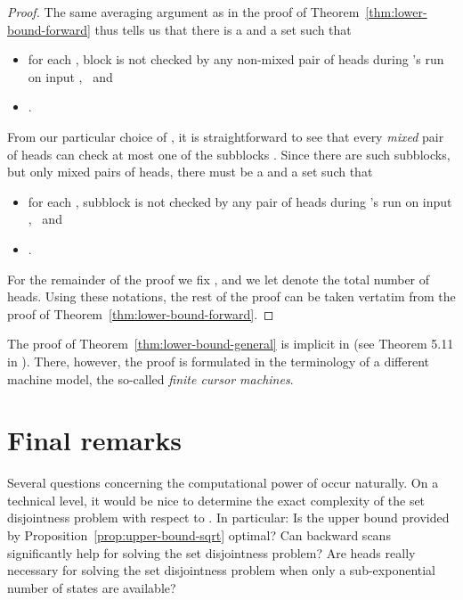 \documentclass[proceedings]{stacs}
\theoremstyle{plain}\newtheorem{satz}[thm]{Satz}
\theoremstyle{definition}\newtheorem{crucial}[thm]{Crucial Definition}
\newenvironment{mi}{\begin{itemize}}{\end{itemize}}
\newcommand{\auta}{\text{mp2s-automata}}
\begin{document}
\begin{proof}
The same averaging argument as in the proof of Theorem~\ref{thm:lower-bound-forward}
thus tells us that there is a
 and 
a set 
such that \vspace{1ex}
\begin{mi}
 \item 
   for each , block  is not checked by any non-mixed pair of
   heads during 's run on input
   , \ and  \vspace{1ex}
 \item 
   . \vspace{1ex}
\end{mi}
From our particular choice of , it is straightforward to see that every
\emph{mixed} pair of heads can check at most one of the subblocks
. Since there are  such subblocks, but
only  mixed pairs of heads, there must be a  
and a set  such that \vspace{1ex}
\begin{mi}
 \item 
   for each , subblock  is not checked by any pair of
   heads during 's run on input
   , \ and  \vspace{1ex}
 \item 
   . \vspace{1ex}
\end{mi}
For the remainder of the proof we fix , and we let
 denote the total number of heads. Using these notations, 
the rest of the proof can be taken vertatim from the proof of 
Theorem~\ref{thm:lower-bound-forward}.
\end{proof}


The proof of
Theorem~\ref{thm:lower-bound-general} is implicit in \cite{FCM-paper}
(see Theorem 5.11 in \cite{FCM-paper}). There, however, the proof is formulated
in the terminology of a different
machine model, the so-called \emph{finite cursor machines}.



\section{Final remarks}\label{section:conclusion}

Several questions concerning the computational power of 
\auta{} occur naturally. On a technical level, it would be nice
to determine the exact complexity of the set disjointness problem with
respect to \auta{}.
In particular: Is the upper bound provided by Proposition~\ref{prop:upper-bound-sqrt}
optimal?
Can backward scans significantly help for solving the set disjointness problem?
Are  heads really necessary for
solving the set disjointness problem when only a sub-exponential number of states
are available?
\end{document}
